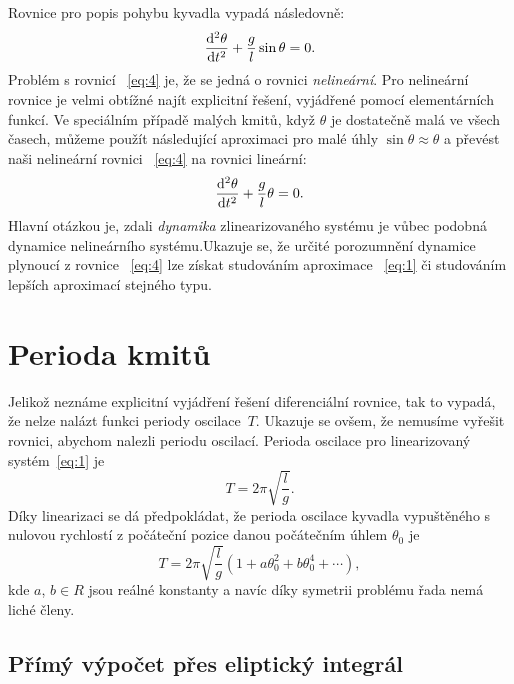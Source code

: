 \documentclass[reqno, a4paper]{amsart}
\begin{document}
		Rovnice pro popis pohybu kyvadla vypadá následovně:
		\begin{equation}
			\label{eq:4}
			\frac{\mathrm{d}^2 {\theta}}{\mathrm{d} {t}^2} + \frac{g}{l} \sin \theta = 0.
		\end{equation}
		Problém s rovnicí ~\eqref{eq:4} je, že se jedná o rovnici \emph{nelineární}. Pro nelineární rovnice je velmi obtížné najít explicitní řešení, vyjádřené pomocí elementárních funkcí.
		Ve speciálním případě malých kmitů, když $\theta$ je dostatečně malá ve všech časech, můžeme použít následující aproximaci pro malé úhly $\sin \theta \approx \theta$ a převést naši nelineární rovnici ~\eqref{eq:4} na rovnici lineární:
		\begin{equation}
			\label{eq:1}
			\frac{\mathrm{d}^2 {\theta}}{\mathrm{d} {t}^2} + \frac{g}{l} \theta = 0.
		\end{equation}
		Hlavní otázkou je, zdali \emph{dynamika} zlinearizovaného systému je vůbec podobná dynamice nelineárního systému.Ukazuje se, že určité porozumnění dynamice plynoucí z rovnice ~\eqref{eq:4} lze získat studováním aproximace ~\eqref{eq:1} či studováním lepších aproximací stejného typu.
		
		\section{Perioda kmitů}
		\label{sec:Perioda kmitů}
		Jelikož neznáme explicitní vyjádření řešení diferenciální rovnice, tak to vypadá, že nelze nalázt funkci periody oscilace~$T$. Ukazuje se ovšem, že nemusíme vyřešit rovnici, abychom nalezli periodu oscilací. Perioda oscilace pro linearizovaný systém~\eqref{eq:1} je
		\begin{equation}
			\label{eq:2}
			T
			=
			2\pi
			\sqrt{
				\frac{l}{g}
			}
			.
		\end{equation}
		Díky linearizaci se dá předpokládat, že perioda oscilace kyvadla vypuštěného s nulovou rychlostí z počáteční pozice danou počátečním úhlem $\theta_{0}$ je 
		\begin{equation}
			\label{eq:3}
			T
			=
			2\pi
			\sqrt{
				\frac{l}{g}
			}
			\left(
			1
			+
			a \theta_{0}^2
			+
			b \theta_{0}^4
			+
			\cdots
			\right)
			,
		\end{equation}
		kde $a$, $b \in R$ jsou reálné konstanty a navíc díky symetrii problému řada nemá liché členy.
		
		\subsection{Přímý výpočet přes eliptický integrál}
		\label{Přímý výpočet přes eliptický integrál}
		
\end{document}
